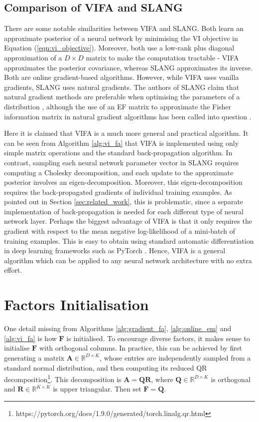 \documentclass[msc,deptreport.inf]{infthesis} %
\newcommand{\matr}[1]{\mathbf{#1}}
\newcommand{\R}{\mathbb R}
\begin{document}
\subsection{Comparison of VIFA and SLANG}

There are some notable similarities between VIFA and SLANG. Both learn an approximate posterior of a neural network by minimising the VI objective in Equation (\ref{eqn:vi_objective}). Moreover, both use a low-rank plus diagonal approximation of a $D \times D$ matrix to make the computation tractable - VIFA approximates the posterior covariance, whereas SLANG approximates its inverse. Both are online gradient-based algorithms. However, while VIFA uses vanilla gradients, SLANG uses natural gradients. The authors of SLANG claim that natural gradient methods are preferable when optimising the parameters of a distribution \cite{mishkin2018}, although the use of an EF matrix to approximate the Fisher information matrix in natural gradient algorithms has been called into question \cite{kunstner2019}.

Here it is claimed that VIFA is a much more general and practical algorithm. It can be seen from Algorithm \ref{alg:vi_fa} that VIFA is implemented using only simple matrix operations and the standard back-propagation algorithm. In contrast, sampling each neural network parameter vector in SLANG requires computing a Cholesky decomposition, and each update to the approximate posterior involves an eigen-decomposition. Moreover, this eigen-decomposition requires the back-propagated gradients of individual training examples. As pointed out in Section \ref{sec:related_work}, this is problematic, since a separate implementation of back-propagation is needed for each different type of neural network layer. Perhaps the biggest advantage of VIFA is that it only requires the gradient with respect to the mean negative log-likelihood of a mini-batch of training examples. This is easy to obtain using standard automatic differentiation in deep learning frameworks such as PyTorch \cite{paszke2019}. Hence, VIFA is a general algorithm which can be applied to any neural network architecture with no extra effort. 


\section{Factors Initialisation}\label{sec:F_init}

One detail missing from Algorithms \ref{alg:gradient_fa}, \ref{alg:online_em} and \ref{alg:vi_fa} is how $\matr{F}$ is initialised. To encourage diverse factors, it makes sense to initialise $\matr{F}$ with orthogonal columns. In practice, this can be achieved by first generating a matrix $\matr{A}  \in \R^{D \times K}$, whose entries are independently sampled from a standard normal distribution, and then computing its reduced QR decomposition\footnote{https://pytorch.org/docs/1.9.0/generated/torch.linalg.qr.html}. This decomposition is $\matr{A} = \matr{Q}\matr{R}$, where $\matr{Q} \in \R^{D \times K}$ is orthogonal and $\matr{R} \in \R^{K \times K}$ is upper triangular. Then set $\matr{F} = \matr{Q}$. 
\end{document}
